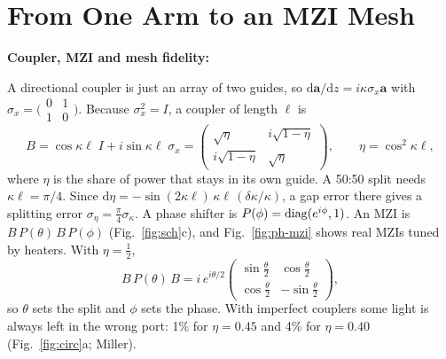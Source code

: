 \documentclass[journal,11pt]{IEEEtran}
\newcommand{\shead}[1]{\par\vspace{5pt}\noindent\textbf{#1:}\par\nopagebreak\vspace{2pt}\noindent\ignorespaces}
\newcommand{\dd}{\mathrm{d}}
\begin{document}
\section{From One Arm to an MZI Mesh}
\shead{Coupler, MZI and mesh fidelity}A directional coupler is just an array of two guides, so $\dd\bm a/\dd z=i\kappa\sigma_x\bm a$ with $\sigma_x=\big(\begin{smallmatrix}0&1\\1&0\end{smallmatrix}\big)$. Because $\sigma_x^2=I$, a coupler of length $\ell$ is
\begin{equation}
B=\cos\kappa\ell\;I+i\sin\kappa\ell\;\sigma_x=\begin{pmatrix}\sqrt\eta&i\sqrt{1-\eta}\\ i\sqrt{1-\eta}&\sqrt\eta\end{pmatrix},\qquad\eta=\cos^2\kappa\ell ,
\label{eq:B}
\end{equation}
where $\eta$ is the share of power that stays in its own guide. A 50:50 split needs $\kappa\ell=\pi/4$. Since $\dd\eta=-\sin(2\kappa\ell)\,\kappa\ell\,(\delta\kappa/\kappa)$, a gap error there gives a splitting error $\sigma_\eta=\frac{\pi}{4}\sigma_\kappa$. A phase shifter is $P(\phi)={\rm diag}(e^{i\phi},1)$. An MZI is $B\,P(\theta)\,B\,P(\phi)$ (Fig.~\ref{fig:sch}c), and Fig.~\ref{fig:ph-mzi} shows real MZIs tuned by heaters. With $\eta=\frac12$,
\begin{equation}
B\,P(\theta)\,B=i\,e^{i\theta/2}\begin{pmatrix}\sin\frac\theta2&\cos\frac\theta2\\[1pt] \cos\frac\theta2&-\sin\frac\theta2\end{pmatrix},
\label{eq:mzi}
\end{equation}
so $\theta$ sets the split and $\phi$ sets the phase. With imperfect couplers some light is always left in the wrong port: 1\% for $\eta=0.45$ and 4\% for $\eta=0.40$ (Fig.~\ref{fig:circ}a; Miller).
\end{document}
